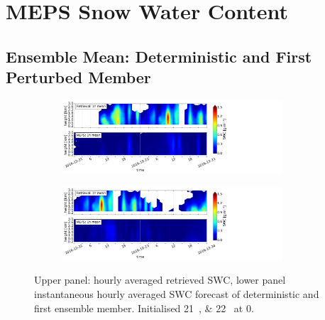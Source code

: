 \chapter{MEPS Snow Water Content}
\section{Ensemble Mean: Deterministic and First Perturbed Member}
\begin{figure}[ht!]%
	\centering
	\begin{subfigure}[t]{\textwidth}
		\centering
		\includegraphics[trim={0.cm 0.8cm 19.cm 0.5cm},clip,width=0.9\textwidth]{./fig_vert_SWC_1h/20161221}
		\caption{}\label{fig:SWC1h:21}
	\end{subfigure}
	\begin{subfigure}[t]{\textwidth}
		\centering
		\includegraphics[trim={0.cm 0.8cm 19.cm 0.5cm},clip,width=0.9\textwidth]{./fig_vert_SWC_1h/20161222}
		\caption{}\label{fig:SWC1h:22}
	\end{subfigure}
	\caption{Upper panel: hourly averaged retrieved SWC, lower panel instantaneous hourly averaged SWC forecast of deterministic and first ensemble member. Initialised \SIlist{21;22}{\dec} at \SI{0}{\UTC}. }\label{fig:SWC1h}
\end{figure}
